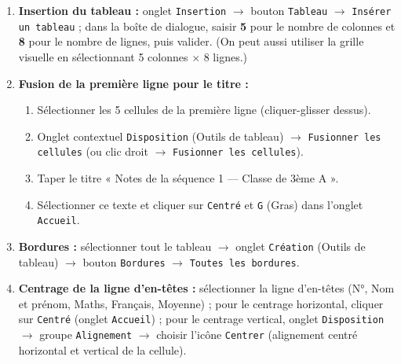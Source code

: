 \documentclass[11pt]{article}
\begin{document}
\begin{corrige}
\begin{enumerate}
\item \textbf{Insertion du tableau :} onglet \texttt{Insertion} $\to$ bouton \texttt{Tableau} $\to$ \texttt{Insérer un tableau} ; dans la boîte de dialogue, saisir \textbf{5} pour le nombre de colonnes et \textbf{8} pour le nombre de lignes, puis valider. (On peut aussi utiliser la grille visuelle en sélectionnant 5 colonnes $\times$ 8 lignes.)
\item \textbf{Fusion de la première ligne pour le titre :}
\begin{enumerate}
\item Sélectionner les 5 cellules de la première ligne (cliquer-glisser dessus).
\item Onglet contextuel \texttt{Disposition} (Outils de tableau) $\to$ \texttt{Fusionner les cellules} (ou clic droit $\to$ \texttt{Fusionner les cellules}).
\item Taper le titre « Notes de la séquence 1 — Classe de 3ème A ».
\item Sélectionner ce texte et cliquer sur \texttt{Centré} et \texttt{G} (Gras) dans l'onglet \texttt{Accueil}.
\end{enumerate}
\item \textbf{Bordures :} sélectionner tout le tableau $\to$ onglet \texttt{Création} (Outils de tableau) $\to$ bouton \texttt{Bordures} $\to$ \texttt{Toutes les bordures}.
\item \textbf{Centrage de la ligne d'en-têtes :} sélectionner la ligne d'en-têtes (N°, Nom et prénom, Maths, Français, Moyenne) ; pour le centrage horizontal, cliquer sur \texttt{Centré} (onglet \texttt{Accueil}) ; pour le centrage vertical, onglet \texttt{Disposition} $\to$ groupe \texttt{Alignement} $\to$ choisir l'icône \texttt{Centrer} (alignement centré horizontal et vertical de la cellule).
\end{enumerate}
\end{corrige}
\end{document}
